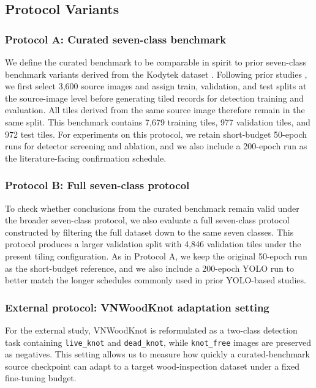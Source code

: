 \documentclass[10pt,a4paper]{article}
\begin{document}
\subsection{Protocol Variants}
\label{sec:protocol}

\subsubsection{Protocol A: Curated seven-class benchmark}
We define the curated benchmark to be comparable in spirit to prior seven-class benchmark variants derived from the Kodytek dataset \citep{kodytek_dataset}. Following prior studies \citep{odca_yolo,bpn_yolo,sim_yolo,fdd_yolo,an_cwb_yolov8}, we first select 3,600 source images and assign train, validation, and test splits at the source-image level before generating tiled records for detection training and evaluation. All tiles derived from the same source image therefore remain in the same split. This benchmark contains 7,679 training tiles, 977 validation tiles, and 972 test tiles. For experiments on this protocol, we retain short-budget 50-epoch runs for detector screening and ablation, and we also include a 200-epoch run as the literature-facing confirmation schedule.

\subsubsection{Protocol B: Full seven-class protocol}
To check whether conclusions from the curated benchmark remain valid under the broader seven-class protocol, we also evaluate a full seven-class protocol constructed by filtering the full dataset down to the same seven classes. This protocol produces a larger validation split with 4,846 validation tiles under the present tiling configuration. As in Protocol A, we keep the original 50-epoch run as the short-budget reference, and we also include a 200-epoch YOLO run to better match the longer schedules commonly used in prior YOLO-based studies.

\subsubsection{External protocol: VNWoodKnot adaptation setting}
For the external study, VNWoodKnot is reformulated as a two-class detection task containing \texttt{live\_knot} and \texttt{dead\_knot}, while \texttt{knot\_free} images are preserved as negatives. This setting allows us to measure how quickly a curated-benchmark source checkpoint can adapt to a target wood-inspection dataset under a fixed fine-tuning budget.
\end{document}
